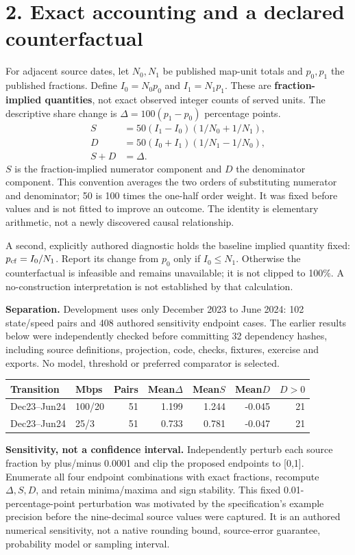 \documentclass[10pt,letterpaper]{article}
\begin{document}
\section*{2. Exact accounting and a declared counterfactual}
For adjacent source dates, let $N_0,N_1$ be published map-unit totals and $p_0,p_1$ the published fractions. Define $I_0=N_0p_0$ and $I_1=N_1p_1$. These are \textbf{fraction-implied quantities}, not exact observed integer counts of served units. The descriptive share change is $\Delta=100(p_1-p_0)$ percentage points.
\begin{align*}
S&=50(I_1-I_0)(1/N_0+1/N_1),\\
D&=50(I_0+I_1)(1/N_1-1/N_0),\\
S+D&=\Delta.
\end{align*}
$S$ is the fraction-implied numerator component and $D$ the denominator component. This convention averages the two orders of substituting numerator and denominator; 50 is 100 times the one-half order weight. It was fixed before values and is not fitted to improve an outcome. The identity is elementary arithmetic, not a newly discovered causal relationship.

A second, explicitly authored diagnostic holds the baseline implied quantity fixed: $p_{\rm cf}=I_0/N_1$. Report its change from $p_0$ only if $I_0\le N_1$. Otherwise the counterfactual is infeasible and remains unavailable; it is not clipped to 100\%. A no-construction interpretation is not established by that calculation.

\textbf{Separation.} Development uses only December 2023 to June 2024: 102 state/speed pairs and 408 authored sensitivity endpoint cases. The earlier results below were independently checked before committing 32 dependency hashes, including source definitions, projection, code, checks, fixtures, exercise and exports. No model, threshold or preferred comparator is selected.
\begin{center}\small\begin{tabular}{@{}llrrrrr@{}}\toprule
Transition & Mbps & Pairs & Mean$\Delta$ & Mean$S$ & Mean$D$ & $D>0$\\\midrule
Dec23--Jun24 & 100/20 & 51 & 1.199 & 1.244 & -0.045 & 21 \\
Dec23--Jun24 & 25/3 & 51 & 0.733 & 0.781 & -0.047 & 21 \\
\bottomrule\end{tabular}\end{center}

\textbf{Sensitivity, not a confidence interval.} Independently perturb each source fraction by plus/minus 0.0001 and clip the proposed endpoints to [0,1]. Enumerate all four endpoint combinations with exact fractions, recompute $\Delta,S,D$, and retain minima/maxima and sign stability. This fixed 0.01-percentage-point perturbation was motivated by the specification's example precision before the nine-decimal source values were captured. It is an authored numerical sensitivity, not a native rounding bound, source-error guarantee, probability model or sampling interval.
\end{document}
